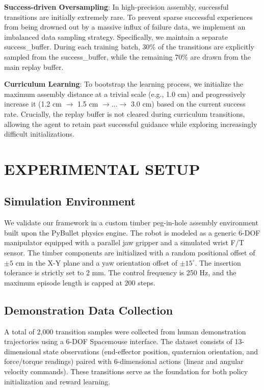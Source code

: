\documentclass[conference]{IEEEtran}
\begin{document}
\textbf{Success-driven Oversampling}: In high-precision assembly, successful transitions are initially extremely rare. To prevent sparse successful experiences from being drowned out by a massive influx of failure data, we implement an imbalanced data sampling strategy. Specifically, we maintain a separate success\_buffer. During each training batch, 30\% of the transitions are explicitly sampled from the success\_buffer, while the remaining 70\% are drawn from the main replay buffer.

\textbf{Curriculum Learning}: To bootstrap the learning process, we initialize the maximum assembly distance at a trivial scale (e.g., 1.0 cm) and progressively increase it (1.2 cm $\rightarrow$ 1.5 cm $\rightarrow \dots \rightarrow$ 3.0 cm) based on the current success rate. Crucially, the replay buffer is not cleared during curriculum transitions, allowing the agent to retain past successful guidance while exploring increasingly difficult initializations.

\section{EXPERIMENTAL SETUP}
\subsection{Simulation Environment}
We validate our framework in a custom timber peg-in-hole assembly environment built upon the PyBullet physics engine. The robot is modeled as a generic 6-DOF manipulator equipped with a parallel jaw gripper and a simulated wrist F/T sensor. The timber components are initialized with a random positional offset of $\pm5$ cm in the X-Y plane and a yaw orientation offset of $\pm15^\circ$. The insertion tolerance is strictly set to 2 mm. The control frequency is 250 Hz, and the maximum episode length is capped at 200 steps.

\subsection{Demonstration Data Collection}
A total of 2,000 transition samples were collected from human demonstration trajectories using a 6-DOF Spacemouse interface. The dataset consists of 13-dimensional state observations (end-effector position, quaternion orientation, and force/torque readings) paired with 6-dimensional actions (linear and angular velocity commands). These transitions serve as the foundation for both policy initialization and reward learning.
\end{document}
